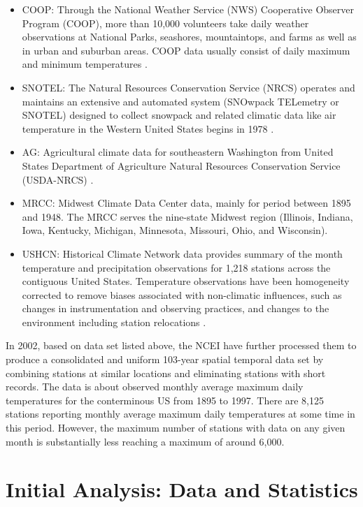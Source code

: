 \begin{itemize}
  \item COOP:
    Through the National Weather Service (NWS) Cooperative Observer Program 
    (COOP), more than 10,000 volunteers take daily weather observations at 
    National Parks, seashores, mountaintops, and farms as well as in urban and 
    suburban areas. COOP data usually consist of daily maximum and minimum 
    temperatures \cite{COOP}.
  \item SNOTEL:
    The Natural Resources Conservation Service (NRCS) operates and maintains an 
    extensive and automated system (SNOwpack TELemetry or SNOTEL) designed to
    collect snowpack and related climatic data like air temperature in the Western
    United States begins in 1978 \cite{SNOTEL}.
  \item AG:
    Agricultural climate data for southeastern Washington from United States
    Department of Agriculture Natural Resources Conservation Service (USDA-NRCS) 
    \cite{USDA}.
  \item MRCC:
    Midwest Climate Data Center data, mainly for period between 1895 and 1948. 
    The MRCC \cite{MRCC} serves the nine-state Midwest region (Illinois, Indiana, 
    Iowa, Kentucky, Michigan, Minnesota, Missouri, Ohio, and Wisconsin).
  \item USHCN:
    Historical Climate Network data provides summary of the month temperature and 
    precipitation observations for 1,218 stations across the contiguous United 
    States. Temperature observations have been homogeneity corrected to remove 
    biases associated with non-climatic influences, such as changes in 
    instrumentation and observing practices, and changes to the environment 
    including station relocations \cite{USHCN}.
\end{itemize}

In 2002, based on data set listed above, the NCEI \cite{NCEI} have further processed 
them to produce a consolidated and uniform 103-year spatial temporal data set by 
combining stations at similar locations and eliminating stations with short records.
The data is about observed monthly average maximum daily temperatures for the 
conterminous US from 1895 to 1997. There are 8,125 stations reporting monthly average 
maximum daily temperatures at some time in this period. However, the maximum number 
of stations with data on any given month is substantially less reaching a maximum of 
around 6,000. 

\section{Initial Analysis: Data and Statistics}

